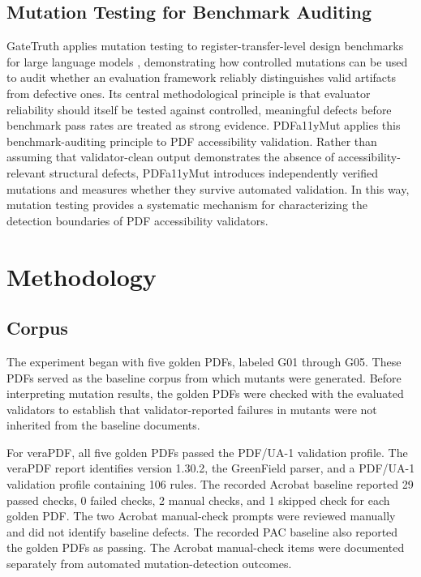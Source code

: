 \documentclass[conference]{IEEEtran}
\begin{document}
\subsection{Mutation Testing for Benchmark Auditing}

GateTruth applies mutation testing to register-transfer-level design benchmarks for large language models \cite{bhadra2026gatetruth}, demonstrating how controlled mutations can be used to audit whether an evaluation framework reliably distinguishes valid artifacts from defective ones. Its central methodological principle is that evaluator reliability should itself be tested against controlled, meaningful defects before benchmark pass rates are treated as strong evidence. PDFa11yMut applies this benchmark-auditing principle to PDF accessibility validation. Rather than assuming that validator-clean output demonstrates the absence of accessibility-relevant structural defects, PDFa11yMut introduces independently verified mutations and measures whether they survive automated validation. In this way, mutation testing provides a systematic mechanism for characterizing the detection boundaries of PDF accessibility validators.

\section{Methodology}

\subsection{Corpus}

The experiment began with five golden PDFs, labeled G01 through G05. These PDFs served as the baseline corpus from which mutants were generated. Before interpreting mutation results, the golden PDFs were checked with the evaluated validators to establish that validator-reported failures in mutants were not inherited from the baseline documents.

For veraPDF, all five golden PDFs passed the PDF/UA-1 validation profile. The veraPDF report identifies version 1.30.2, the GreenField parser, and a PDF/UA-1 validation profile containing 106 rules. The recorded Acrobat baseline reported 29 passed checks, 0 failed checks, 2 manual checks, and 1 skipped check for each golden PDF. The two Acrobat manual-check prompts were reviewed manually and did not identify baseline defects. The recorded PAC baseline also reported the golden PDFs as passing. The Acrobat manual-check items were documented separately from automated mutation-detection outcomes.
\end{document}

